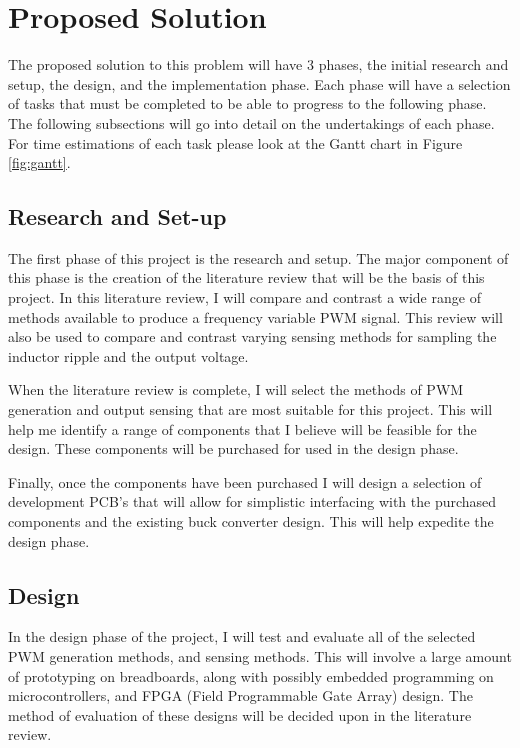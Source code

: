 \documentclass[11pt, a4paper, twoside, openright]{report}
\begin{document}
\section{Proposed Solution}

The proposed solution to this problem will have 3 phases, the initial research and setup, the design, and the implementation phase. Each phase will have a selection of tasks that must be completed to be able to progress to the following phase. The following subsections will go into detail on the undertakings of each phase. For time estimations of each task please look at the Gantt chart in Figure \ref{fig:gantt}.

\subsection{Research and Set-up}

The first phase of this project is the research and setup. The major component of this phase is the creation of the literature review that will be the basis of this project. In this literature review, I will compare and contrast a wide range of methods available to produce a frequency variable PWM signal. This review will also be used to compare and contrast varying sensing methods for sampling the inductor ripple and the output voltage.

When the literature review is complete, I will select the methods of PWM generation and output sensing that are most suitable for this project. This will help me identify a range of components that I believe will be feasible for the design. These components will be purchased for used in the design phase.

Finally, once the components have been purchased I will design a selection of development PCB's that will allow for simplistic interfacing with the purchased components and the existing buck converter design. This will help expedite the design phase.

\subsection{Design}
\label{sec:design}

In the design phase of the project, I will test and evaluate all of the selected PWM generation methods, and sensing methods. This will involve a large amount of prototyping on breadboards, along with possibly embedded programming on microcontrollers, and FPGA (Field Programmable Gate Array) design. The method of evaluation of these designs will be decided upon in the literature review.
\end{document}
